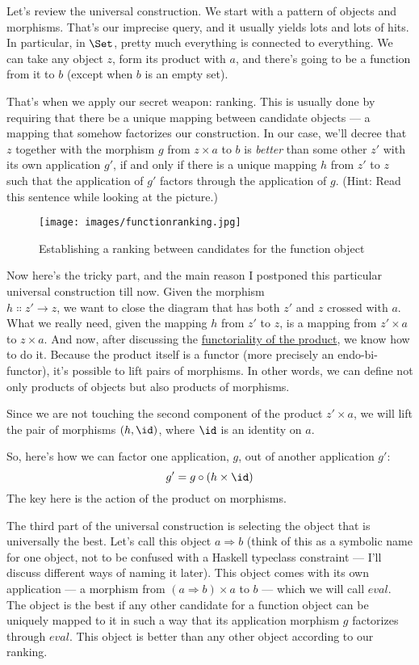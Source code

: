 Let's review the universal construction. We start with a pattern of
objects and morphisms. That's our imprecise query, and it usually yields
lots and lots of hits. In particular, in $\Set$, pretty much
everything is connected to everything. We can take any object
$z$, form its product with $a$, and there's going to be a
function from it to $b$ (except when $b$ is an empty set).

That's when we apply our secret weapon: ranking. This is usually done by
requiring that there be a unique mapping between candidate objects --- a
mapping that somehow factorizes our construction. In our case, we'll
decree that $z$ together with the morphism $g$ from
$z \times a$ to $b$ is \emph{better} than some other
$z'$ with its own application $g'$, if and
only if there is a unique mapping $h$ from $z'$ to
$z$ such that the application of $g'$ factors
through the application of $g$. (Hint: Read this sentence while
looking at the picture.)

\begin{figure}[h]
\centering
\texttt{[image: images/functionranking.jpg]}
\caption{Establishing a ranking between candidates for the function object}
\end{figure}

Now here's the tricky part, and the main reason I postponed this
particular universal construction till now. Given the morphism\\
$h \Colon z'\to z$, we want to close the diagram
that has both $z'$ and $z$ crossed with $a$.
What we really need, given the mapping $h$ from $z'$
to $z$, is a mapping from $z' \times a$ to $z \times a$.
And now, after discussing the \hyperref[functoriality]{functoriality
of the product}, we know how to do it. Because the product itself is a
functor (more precisely an endo-bi-functor), it's possible to lift pairs
of morphisms. In other words, we can define not only products of objects
but also products of morphisms.

Since we are not touching the second component of the product
$z' \times a$, we will lift the pair of morphisms
$(h, \id)$, where $\id$ is an identity on $a$.

So, here's how we can factor one application, $g$, out of another
application $g'$:
\[g' = g \circ (h \times \id)\]
The key here is the action of the product on morphisms.

The third part of the universal construction is selecting the object
that is universally the best. Let's call this object $a \Rightarrow b$ (think
of this as a symbolic name for one object, not to be confused with a
Haskell typeclass constraint --- I'll discuss different ways of naming
it later). This object comes with its own application --- a morphism
from $(a \Rightarrow b) \times a$ to $b$ --- which we will call
$eval$. The object  is the best if any other
candidate for a function object can be uniquely mapped to it in such a
way that its application morphism $g$ factorizes through
$eval$. This object is better than any other object according to
our ranking.

